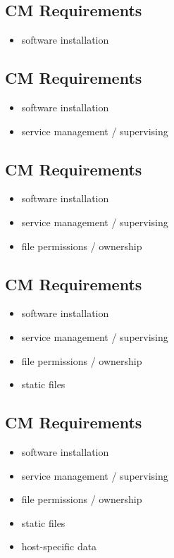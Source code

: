 \documentclass[xga]{xdvislides}
\begin{document}
\subsection{CM Requirements}
\begin{itemize}
	\item software installation
\end{itemize}

\subsection{CM Requirements}
\begin{itemize}
	\item software installation
	\item service management / supervising
\end{itemize}

\subsection{CM Requirements}
\begin{itemize}
	\item software installation
	\item service management / supervising
	\item file permissions / ownership
\end{itemize}

\subsection{CM Requirements}
\begin{itemize}
	\item software installation
	\item service management / supervising
	\item file permissions / ownership
	\item static files
\end{itemize}

\subsection{CM Requirements}
\begin{itemize}
	\item software installation
	\item service management / supervising
	\item file permissions / ownership
	\item static files
	\item host-specific data
\end{itemize}
\end{document}

